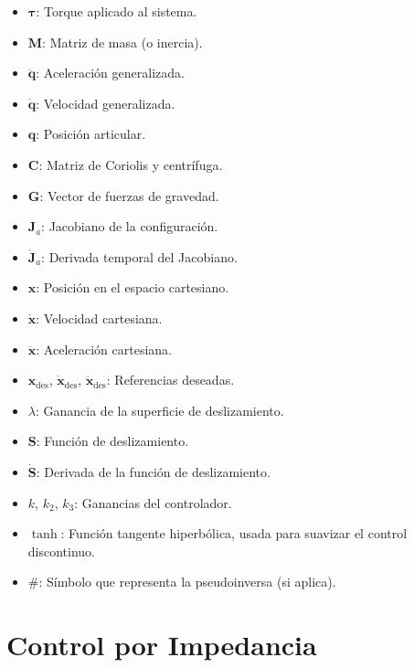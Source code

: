 \begin{itemize}
    \item \textbf{\( \boldsymbol{\tau} \)}: Torque aplicado al sistema.
    \item \textbf{\( \boldsymbol{M} \)}: Matriz de masa (o inercia).
    \item \textbf{\( \boldsymbol{\ddot{q}} \)}: Aceleración generalizada.
    \item \textbf{\( \boldsymbol{\dot{q}} \)}: Velocidad generalizada.
    \item \textbf{\( \boldsymbol{q} \)}: Posición articular.
    \item \textbf{\( \boldsymbol{C} \)}: Matriz de Coriolis y centrífuga.
    \item \textbf{\( \boldsymbol{G} \)}: Vector de fuerzas de gravedad.
    \item \textbf{\( \boldsymbol{J}_a \)}: Jacobiano de la configuración.
    \item \textbf{\( \boldsymbol{\dot{J}}_a \)}: Derivada temporal del Jacobiano.
    \item \textbf{\( \boldsymbol{x} \)}: Posición en el espacio cartesiano.
    \item \textbf{\( \boldsymbol{\dot{x}} \)}: Velocidad cartesiana.
    \item \textbf{\( \boldsymbol{\ddot{x}} \)}: Aceleración cartesiana.
    \item \textbf{\( \boldsymbol{x}_{\text{des}} \)}, \( \boldsymbol{\dot{x}}_{\text{des}} \), \(
          \boldsymbol{\ddot{x}}_{\text{des}} \): Referencias deseadas.
    \item \textbf{\( \lambda \)}: Ganancia de la superficie de deslizamiento.
    \item \textbf{\( \boldsymbol{S} \)}: Función de deslizamiento.
    \item \textbf{\( \boldsymbol{\dot{S}} \)}: Derivada de la función de deslizamiento.
    \item \textbf{\( k \)}, \textbf{\( k_2 \)}, \textbf{\( k_3 \)}: Ganancias
          del controlador.
    \item \textbf{\( \tanh \)}: Función tangente hiperbólica, usada para
          suavizar el control discontinuo.
    \item \textbf{\( \# \)}: Símbolo que representa la pseudoinversa (si
          aplica).
\end{itemize}

\section{Control por Impedancia}

